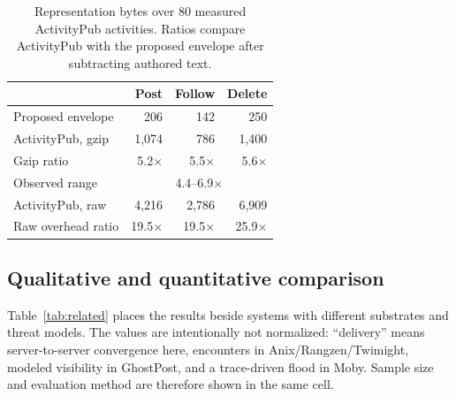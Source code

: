 \documentclass[sigconf,anonymous]{acmart}
\begin{document}
\begin{table}[t]
\caption{Representation bytes over 80 measured ActivityPub activities. Ratios compare ActivityPub
with the proposed envelope after subtracting authored text.}
\label{tab:size}
\centering
\small
\begin{tabular}{lrrr}
\toprule
 & Post & Follow & Delete \\
\midrule
Proposed envelope & 206 & 142 & 250 \\
ActivityPub, gzip & 1,074 & 786 & 1,400 \\
Gzip ratio & 5.2$\times$ & 5.5$\times$ & 5.6$\times$ \\
Observed range & \multicolumn{3}{c}{4.4--6.9$\times$} \\
ActivityPub, raw & 4,216 & 2,786 & 6,909 \\
Raw overhead ratio & 19.5$\times$ & 19.5$\times$ & 25.9$\times$ \\
\bottomrule
\end{tabular}
\end{table}

\subsection{Qualitative and quantitative comparison}

Table~\ref{tab:related} places the results beside systems with different substrates and threat
models. The values are intentionally not normalized: ``delivery'' means server-to-server convergence
here, encounters in Anix/Rangzen/Twimight, modeled visibility in GhostPost, and a trace-driven flood
in Moby. Sample size and evaluation method are therefore shown in the same cell.
\end{document}
